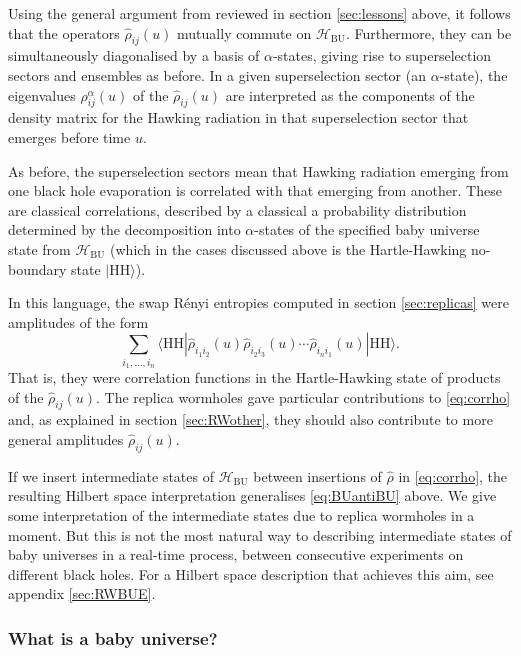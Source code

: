 \documentclass[letterpaper,12pt]{article}
\newcommand*{\hbu}{\mathcal{H}_\text{BU}} %
\newcommand{\HH}{\mathrm{HH}} %
\begin{document}
Using  the general argument from \cite{Marolf:2020xie} reviewed in section \ref{sec:lessons} above, it follows that the operators $\hat{\rho}_{ij}(u)$ mutually commute on $\hbu$. Furthermore, they can be simultaneously diagonalised by a basis of $\alpha$-states, giving rise to superselection sectors and ensembles as before. In a given superselection sector (an $\alpha$-state),
the eigenvalues $\rho^\alpha_{ij}(u)$ of the $\hat{\rho}_{ij}(u)$  are interpreted as the components of the density matrix for the Hawking radiation in that superselection sector that emerges before time $u$.

As before, the superselection sectors mean that Hawking radiation emerging from one black hole evaporation is correlated with that emerging from another.  These are classical correlations, described by a classical a probability distribution determined by the decomposition into $\alpha$-states of the specified baby universe state from $\hbu$ (which in the cases discussed above is the Hartle-Hawking no-boundary state $|\HH\rangle$).

In this language, the swap R\'enyi entropies computed in section \ref{sec:replicas} were amplitudes of the form
\begin{equation}
\label{eq:corrho}
	 \sum_{i_1,\ldots,i_n}\langle\HH|\hat{\rho}_{i_1i_2}(u)\hat{\rho}_{i_2i_3}(u)\cdots \hat{\rho}_{i_{n}i_1}(u)|\HH\rangle.
\end{equation}
That is, they were correlation functions in the Hartle-Hawking state of products of the $\hat{\rho}_{ij}(u)$. The replica wormholes gave particular contributions to \eqref{eq:corrho} and, as explained in section \ref{sec:RWother}, they should also contribute to more general amplitudes
$\hat{\rho}_{ij}(u)$.

If we insert intermediate states of $\hbu$ between insertions of $\hat{\rho}$ in \eqref{eq:corrho}, the resulting Hilbert space interpretation generalises \eqref{eq:BUantiBU} above. We give some interpretation of the intermediate states due to replica wormholes in a moment. But this is not the most natural way to describing intermediate states of baby universes in a real-time process, between consecutive experiments on different black holes. For a Hilbert space description that achieves this aim, see appendix \ref{sec:RWBUE}.

\subsubsection{What is a baby universe?}
\label{sec:Whatbaby}
\end{document}

